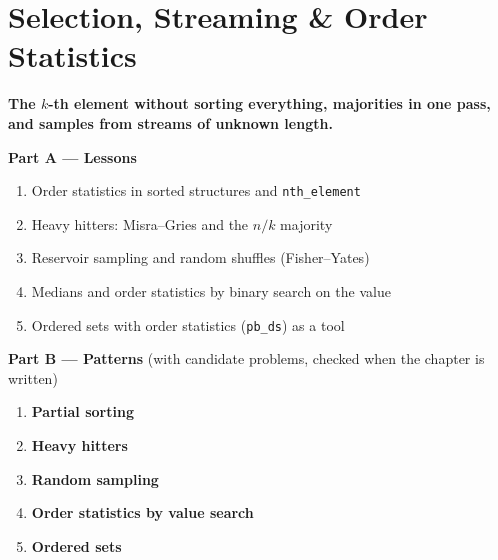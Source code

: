 \chapter{Selection, Streaming \& Order Statistics}
\label{ch:selection}

\begin{tcolorbox}[enhanced, colback=white, colframe=secondaryblue, boxrule=1pt, arc=2mm]
\textbf{\large\textcolor{primaryblue}{The $k$-th element without sorting everything, majorities in one pass, and samples from streams of unknown length.}}
\end{tcolorbox}


\begin{plannedbox}
\textbf{Part A --- Lessons}
\begin{enumerate}[leftmargin=*, label=\textbf{A\arabic*.}, itemsep=1pt]
    \item Order statistics in sorted structures and \texttt{nth\_element}
    \item Heavy hitters: Misra--Gries and the $n/k$ majority
    \item Reservoir sampling and random shuffles (Fisher--Yates)
    \item Medians and order statistics by binary search on the value
    \item Ordered sets with order statistics (\texttt{pb\_ds}) as a tool
\end{enumerate}
\textbf{Part B --- Patterns} (with candidate problems, checked when the chapter is written)
\begin{enumerate}[leftmargin=*, label=\textbf{P\arabic*.}, itemsep=1pt]
    \item \textbf{Partial sorting}
    \item \textbf{Heavy hitters}
    \item \textbf{Random sampling}
    \item \textbf{Order statistics by value search}
    \item \textbf{Ordered sets}
\end{enumerate}
\end{plannedbox}
